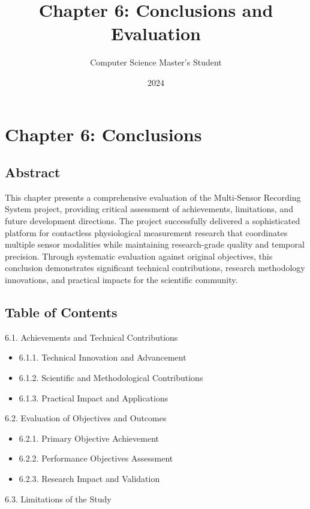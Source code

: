 \documentclass[12pt,a4paper]{article}
\title{Chapter 6: Conclusions and Evaluation}
\author{Computer Science Master's Student}
\date{2024}
\begin{document}
\maketitle

\section{Chapter 6: Conclusions}

\subsection{Abstract}

This chapter presents a comprehensive evaluation of the Multi-Sensor Recording System project, providing critical
assessment of achievements, limitations, and future development directions. The project successfully delivered a
sophisticated platform for contactless physiological measurement research that coordinates multiple sensor modalities
while maintaining research-grade quality and temporal precision. Through systematic evaluation against original
objectives, this conclusion demonstrates significant technical contributions, research methodology innovations, and
practical impacts for the scientific community.

\subsection{Table of Contents}

6.1. Achievements and Technical Contributions

\begin{itemize}
\item 6.1.1. Technical Innovation and Advancement
\item 6.1.2. Scientific and Methodological Contributions
\item 6.1.3. Practical Impact and Applications

\end{itemize}
6.2. Evaluation of Objectives and Outcomes

\begin{itemize}
\item 6.2.1. Primary Objective Achievement
\item 6.2.2. Performance Objectives Assessment
\item 6.2.3. Research Impact and Validation

\end{itemize}
6.3. Limitations of the Study
\end{document}
